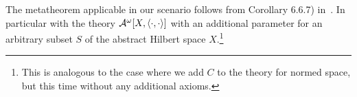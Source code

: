The metatheorem applicable
in our scenario follows from Corollary 6.6.7) in~\cite{GK08}. In particular with 
the theory $\mathcal{A}^\omega[X,\langle\cdot,\cdot\rangle]$ with an additional parameter for an arbitrary subset $S$ of the
abstract Hilbert space $X$.\footnote{This is analogous to the case where we add $C$ to the
theory for normed space, but this time without any additional axioms.}\\

